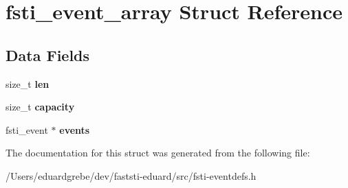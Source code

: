 \hypertarget{structfsti__event__array}{}\section{fsti\+\_\+event\+\_\+array Struct Reference}
\label{structfsti__event__array}
\subsection*{Data Fields}
\begin{DoxyCompactItemize}
\item 
\mbox{\label{structfsti__event__array_ada6ee09934336597d954b693677a93ad}} 
size\+\_\+t {\bfseries len}
\item 
\mbox{\label{structfsti__event__array_aa84e4bbb164ccb3c949f051f5ef4db5e}} 
size\+\_\+t {\bfseries capacity}
\item 
\mbox{\label{structfsti__event__array_a71cfad0ae250352091479f8bfebd6fcb}} 
fsti\+\_\+event $\ast$ {\bfseries events}
\end{DoxyCompactItemize}


The documentation for this struct was generated from the following file\+:\begin{DoxyCompactItemize}
\item 
/\+Users/eduardgrebe/dev/faststi-\/eduard/src/fsti-\/eventdefs.\+h\end{DoxyCompactItemize}
